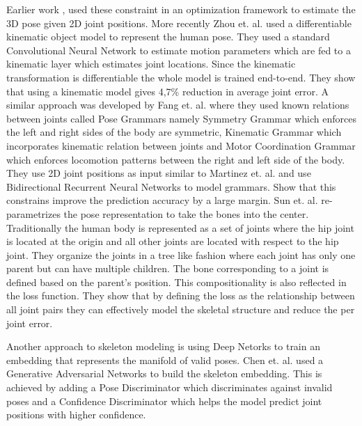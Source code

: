 Earlier work \parencite{barron2001estimating}, \parencite{wei2009modeling} used these constraint in an optimization framework to estimate the 3D pose given 2D joint positions. More recently Zhou et. al. \parencite{zhou2016deep} used a differentiable kinematic object model to represent the human pose. They used a standard Convolutional Neural Network to estimate motion parameters which are fed to a kinematic layer which estimates joint locations. Since the kinematic transformation is differentiable the whole model is trained end-to-end. They show that using a kinematic model gives 4,7\% reduction in average joint error. A similar approach was developed by Fang et. al. \parencite{fang2018learning} where they used known relations between joints called Pose Grammars namely Symmetry Grammar which enforces the left and right sides of the body are symmetric, Kinematic Grammar which incorporates kinematic relation between joints and Motor Coordination Grammar which enforces locomotion patterns between the right and left side of the body. They use 2D joint positions as input similar to Martinez et. al. \parencite{martinez2017simple} and use Bidirectional Recurrent Neural Networks \parencite{schuster1997bidirectional} to model grammars. Show that this constrains improve the prediction accuracy by a large margin. Sun et. al. \parencite{sun2017compositional} re-parametrizes the pose representation to take the bones into the center. Traditionally the human body is represented as a set of joints where the hip joint is located at the origin and all other joints are located with respect to the hip joint. They organize the joints in a tree like fashion where each joint has only one parent but can have multiple children. The bone corresponding to a joint is defined based on the parent's position. This compositionality is also reflected in the loss function. They show that by defining the loss as the relationship between all joint pairs they can effectively model the skeletal structure and reduce the per joint error. 

Another approach to skeleton modeling is using Deep Netorks to train an embedding that represents the manifold of valid poses. Chen et. al. \parencite{chen2017adversarial} used a Generative Adversarial Networks \parencite{goodfellow2014generative} to build the skeleton embedding. This is achieved by adding a Pose Discriminator which discriminates against invalid poses and a Confidence Discriminator which helps the model predict joint positions with higher confidence. 

